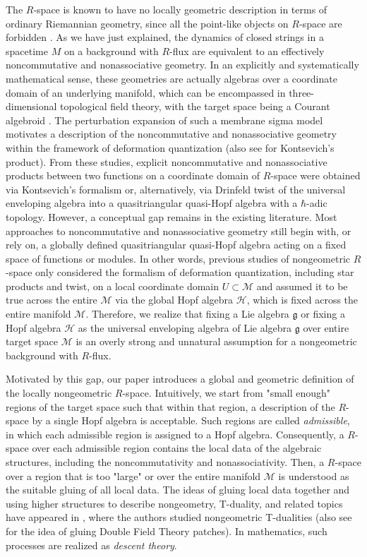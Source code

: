 \documentclass[reqno]{amsart}
\theoremstyle{definition}
\theoremstyle{remark}
\begin{document}
    The $R$-space is known to have no locally geometric description in terms of ordinary Riemannian geometry, since all the point-like objects on $R$-space are forbidden \cite{plauschinn2019non}. As we have just explained, the dynamics of closed strings in a spacetime $M$ on a background with $R$-flux are equivalent to an effectively noncommutative and nonassociative geometry. In an explicitly and systematically mathematical sense, these geometries are actually algebras over a coordinate domain of an underlying manifold, which can be encompassed in three-dimensional topological field theory, with the target space being a Courant algebroid \cite{roytenberg2007aksz,ikeda2003chern}. The perturbation expansion of such a membrane sigma model motivates a description of the noncommutative and nonassociative geometry within the framework of deformation quantization \cite{mylonas2014nonassociative} (also see \cite{moshayedi2022kontsevich} for Kontsevich's product). From these studies, explicit noncommutative and nonassociative products between two functions on a coordinate domain of $R$-space were obtained via Kontsevich’s formalism or, alternatively, via Drinfeld twist of the universal enveloping algebra into a quasitriangular quasi-Hopf algebra with a $\hbar$-adic topology. However, a conceptual gap remains in the existing literature. Most approaches to noncommutative and nonassociative geometry still begin with, or rely on, a globally defined quasitriangular quasi-Hopf algebra acting on a fixed space of functions or modules. In other words, previous studies of nongeometric $R$-space only considered the formalism of deformation quantization, including star products and twist, on a local coordinate domain $U \subset \mathcal{M}$ and assumed it to be true across the entire $\mathcal{M}$ via the global Hopf algebra $\mathscr{H}$, which is fixed across the entire manifold $\mathcal{M}$. Therefore, we realize that fixing a Lie algebra $\mathfrak{g}$ or fixing a Hopf algebra $\mathscr{H}$ as the universal enveloping algebra of Lie algebra $\mathfrak{g}$ over entire target space $\mathcal{M}$ is an overly strong and unnatural assumption for a nongeometric background with $R$-flux.

    Motivated by this gap, our paper introduces a global and geometric definition of the locally nongeometric $R$-space. Intuitively, we start from "small enough" regions of the target space such that within that region, a description of the $R$-space by a single Hopf algebra is acceptable. Such regions are called \textit{admissible}, in which each admissible region is assigned to a Hopf algebra. Consequently, a $R$-space over each admissible region contains the local data of the algebraic structures, including the noncommutativity and nonassociativity. Then, a $R$-space over a region that is too "large" or over the entire manifold $\mathcal{M}$ is understood as the suitable gluing of all local data. The ideas of gluing local data together and using higher structures to describe nongeometry, T-duality, and related topics have appeared in \cite{nikolaus2020higher,kim2022non}, where the authors studied nongeometric T-dualities (also see \cite{alfonsi2021puzzle} for the idea of gluing Double Field Theory patches). In mathematics, such processes are realized as \textit{descent theory}. 
\end{document}
